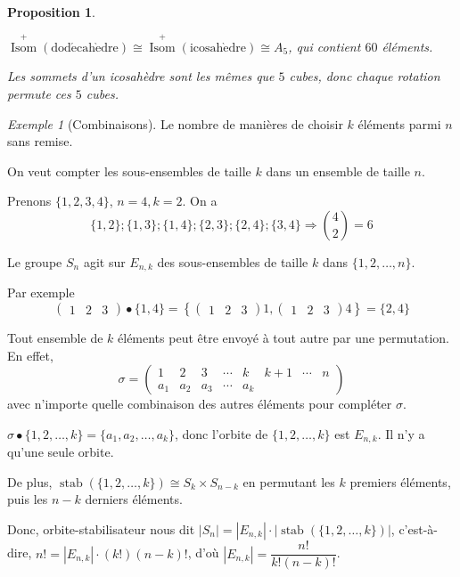\documentclass{report}
\newcommand*{\card}[1]{\left| #1 \right|}
\newcommand*{\stab}{\operatorname{stab}}
\newtheorem*{prop}{Proposition}
\theoremstyle{definition}
\theoremstyle{remark}
\newtheorem*{exem}{Exemple}
\begin{document}
	\begin{prop}~

		$\overset{+}{\operatorname{Isom}}(\mathrm{dod\acute ecah\grave edre}) \cong \overset{+}{\operatorname{Isom}}(\mathrm{icosah\grave edre}) \cong A_5$, qui contient $60$ \'el\'ements.

		Les sommets d'un icosah\`edre sont les m\^emes que $5$ cubes, donc chaque rotation permute ces $5$ cubes.
	\end{prop}
	\begin{exem}[Combinaisons]
		Le nombre de mani\`eres de choisir $k$ \'el\'ements parmi $n$ sans remise.

		On veut compter les sous-ensembles de taille $k$ dans un ensemble de taille $n$.

		Prenons $\{1,2,3,4\}$, $n=4, k=2$. On a
		\[
		\{1,2\}; \{1,3\}; \{1,4\}; \{2,3\}; \{2,4\}; \{3,4\} \Rightarrow \binom{4}{2}=6
		\]

		Le groupe $S_n$ agit sur $E_{n,k}$ des sous-ensembles de taille $k$ dans $\{1,2,\dots,n\}$.

		Par exemple
		\[
		\begin{pmatrix}
			1&2&3
		\end{pmatrix} \bullet \{1,4\} = \left\{\begin{pmatrix}
			1&2&3
		\end{pmatrix} 1, \begin{pmatrix}
			1&2&3
		\end{pmatrix} 4\right\} = \{2,4\}
		\]

		Tout ensemble de $k$ \'el\'ements peut \^etre envoy\'e \`a tout autre par une permutation. En effet,
		\[
		\sigma = \begin{pmatrix}
			1&2&3&\dotsb&k&k+1&\dotsb&n\\
			a_1&a_2&a_3&\dotsb&a_k
		\end{pmatrix}
		\]
		avec n'importe quelle combinaison des autres \'el\'ements pour compl\'eter $\sigma$.

		$\sigma \bullet \{1,2,\dots,k\} = \{a_1,a_2,\dots,a_k\}$, donc l'orbite de $\{1,2,\dots,k\}$ est $E_{n,k}$. Il n'y a qu'une seule orbite.

		De plus, $\stab(\{1,2,\dots,k\}) \cong S_k \times S_{n-k}$ en permutant les $k$ premiers \'el\'ements, puis les $n-k$ derniers \'el\'ements.

		Donc, orbite-stabilisateur nous dit $\card{S_n} = \card{E_{n,k}} \cdot \card{\stab(\{1,2,\dots,k\})}$, c'est-\`a-dire, $n! = \card{E_{n,k}} \cdot (k!)(n-k)!$, d'o\`u $\card{E_{n,k}} = \dfrac{n!}{k!(n-k)!}$.
	\end{exem}
\end{document}
